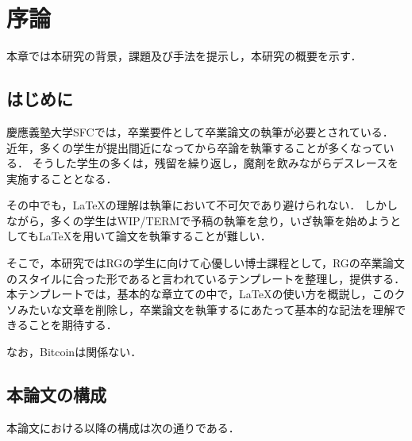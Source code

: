 \chapter{序論}
\label{introduction}

本章では本研究の背景，課題及び手法を提示し，本研究の概要を示す．

\section{はじめに}
\label{introduction:background}
慶應義塾大学SFCでは，卒業要件として卒業論文の執筆が必要とされている．
近年，多くの学生が提出間近になってから卒論を執筆することが多くなっている．
そうした学生の多くは，残留を繰り返し，魔剤を飲みながらデスレースを実施することとなる．

その中でも，\LaTeX の理解は執筆において不可欠であり避けられない．
しかしながら，多くの学生はWIP/TERMで予稿の執筆を怠り，いざ執筆を始めようとしても\LaTeX を用いて論文を執筆することが難しい．

そこで，本研究ではRGの学生に向けて心優しい博士課程として，RGの卒業論文のスタイルに合った形であると言われているテンプレートを整理し，提供する．
本テンプレートでは，基本的な章立ての中で，\LaTeX の使い方を概説し，このクソみたいな文章を削除し，卒業論文を執筆するにあたって基本的な記法を理解できることを期待する．

なお，Bitcoinは関係ない．

\section{本論文の構成}

本論文における以降の構成は次の通りである．



